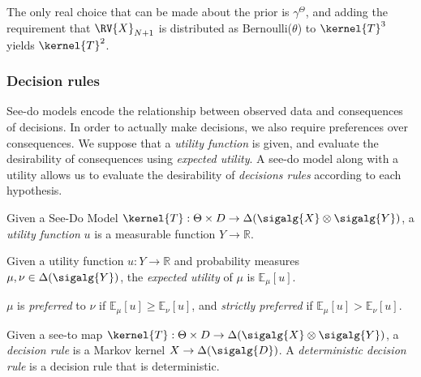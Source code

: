 The only real choice that can be made about the prior is $\gamma^\Theta$, and adding the requirement that $\RV{X}_{N+1}$ is distributed as Bernoulli($\theta$) to $\kernel{T}^3$ yields $\kernel{T}^2$.



\subsubsection{Decision rules}

See-do models encode the relationship between observed data and consequences of decisions. In order to actually make decisions, we also require preferences over consequences. We suppose that a \emph{utility function} is given, and evaluate the desirability of consequences using \emph{expected utility}. A see-do model along with a utility allows us to evaluate the desirability of \emph{decisions rules} according to each hypothesis.

\begin{definition}
Given a See-Do Model $\kernel{T}:\Theta\times D\to \Delta(\sigalg{X}\otimes\sigalg{Y})$, a \emph{utility function} $u$ is a measurable function $Y\to \mathbb{R}$. 
\end{definition}

\begin{definition}
Given a utility function $u:Y\to \mathbb{R}$ and probability measures $\mu,\nu\in \Delta(\sigalg{Y})$, the \emph{expected utility} of $\mu$ is $\mathbb{E}_{\mu}[u]$.

$\mu$ is \emph{preferred} to $\nu$ if $\mathbb{E}_{\mu}[u]\geq \mathbb{E}_{\nu}[u]$, and \emph{strictly preferred} if $\mathbb{E}_{\mu}[u]>\mathbb{E}_{\nu}[u]$.
\end{definition}

\begin{definition}
Given a see-to map $\kernel{T}:\Theta\times D\to \Delta(\sigalg{X}\otimes\sigalg{Y})$, a \emph{decision rule} is a Markov kernel $X\to \Delta(\sigalg{D})$. A \emph{deterministic decision rule} is a decision rule that is deterministic.

\end{definition}

